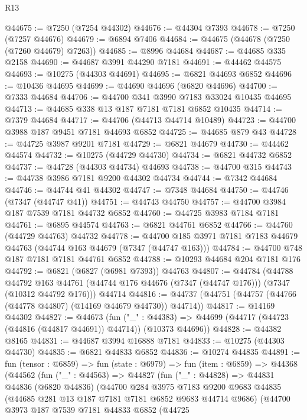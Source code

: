 \begin{lexlean}{R13}
\begin{coremodule}
@44675 := @7250 (@7254 @44302)
@44676 := @44304 @7393
@44678 := @7250 (@7257 @44676)
@44679 := @6894 @7406
@44684 := @44675 (@44678 (@7250 (@7260 @44679) @7263))
@44685 := @8996 @44684
@44687 := @44685 @335 @2158
@44690 := @44687 @3991 @44290 @7181
@44691 := @44462 @44575
@44693 := @10275 (@44303 @44691)
@44695 := @6821 @44693 @6852
@44696 := @10436 @44695
@44699 := @44690 @44696 (@6820 @44696)
@44700 := @7333 @44684
@44706 := @44700 @341 @3990 @7183 @33024 @10435 @44695
@44713 := @44685 @338 @13 @187 @7181 @7181 @6852 @10435
@44714 := @7379 @44684
@44717 := @44706 (@44713 @44714 @10489)
@44723 := @44700 @3988 @187 @9451 @7181 @44693 @6852
@44725 := @44685 @879 @43
@44728 := @44725 @3987 @9201 @7181
@44729 := @6821 @44679
@44730 := @44462 @44574
@44732 := @10275 (@44729 @44730)
@44734 := @6821 @44732 @6852
@44737 := @44728 (@44303 @44734) @44693
@44738 := @44700 @315
@44743 := @44738 @3986 @7181 @9200 @44302 @44734
@44744 := @7342 @44684
@44746 := @44744 @41 @44302
@44747 := @7348 @44684
@44750 := @44746 (@7347 (@44747 @41))
@44751 := @44743 @44750
@44757 := @44700 @3984 @187 @7539 @7181 @44732 @6852
@44760 := @44725 @3983 @7184 @7181
@44761 := @6895 @44574
@44763 := @6821 @44761 @6852
@44766 := @44760 (@44729 @44763) @44732
@44778 := @44700 @185 @3971 @7181 @7183 @44679 @44763 (@44744 @163 @44679 (@7347 (@44747 @163)))
@44784 := @44700 @748 @187 @7181 @7181 @44761 @6852
@44788 := @10293 @44684 @204 @7181 @176
@44792 := @6821 (@6827 (@6981 @7393)) @44763
@44807 := @44784
    (@44788
      @44792
      @163
      @44761
      (@44744 @176 @44676 (@7347 (@44747 @176)))
      (@7347 (@10312 @44792 @176)))
    @44714
@44816 := @44737 (@44751 (@44757 (@44766 (@44778 @44807) (@14169 @44679 @44730)) @44714))
@44817 := @14169 @44302
@44827 := @44673
    (fun ("_" : @44383) => @44699 (@44717 (@44723 (@44816 (@44817 @44691)) @44714)) (@10373 @44696))
@44828 := @44382 @8165
@44831 := @44687 @3994 @16888 @7181
@44833 := @10275 (@44303 @44730)
@44835 := @6821 @44833 @6852
@44836 := @10274 @44835
@44891 := fun (tensor : @6859) =>
  fun (state : @6979) =>
  fun (item : @6859) =>
  @44368
    (@44562
      (fun ("_" : @44563) =>
      @44827
        (fun ("_" : @44828) =>
        @44831
          @44836
          (@6820 @44836)
          (@44700
            @284
            @3975
            @7183
            @9200
            @9683
            @44835
            (@44685 @281 @13 @187 @7181 @7181 @6852 @9683 @44714 @9686)
            (@44700
              @3973
              @187
              @7539
              @7181
              @44833
              @6852
              (@44725

\end{coremodule}
\end{lexlean}
